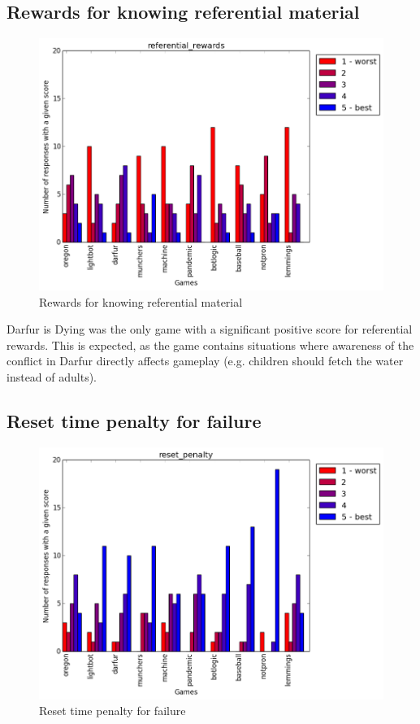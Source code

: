 			\subsection{Rewards for knowing referential material}
				\begin{figure}[] 
				\centering 
				\includegraphics[width=\textwidth, height=.4\textheight, keepaspectratio=true]{referential_rewards_scores.png} 
				\caption{Rewards for knowing referential material}
				\end{figure}

				Darfur is Dying was the only game with a significant positive score for referential rewards. This is expected, as the game contains situations where awareness of the conflict in Darfur directly affects gameplay (e.g. children should fetch the water instead of adults).

			\subsection{Reset time penalty for failure}
				\begin{figure}[] 
				\centering 
				\includegraphics[width=\textwidth, height=.4\textheight, keepaspectratio=true]{reset_penalty_scores.png} 
				\caption{Reset time penalty for failure}
				\end{figure}

